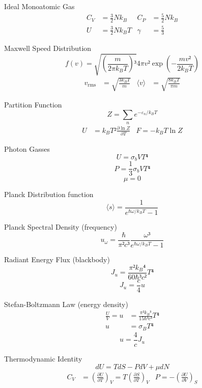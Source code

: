 \documentclass[avery5371]{flashcards}
\begin{document}
\begin{flashcard}{Ideal Monoatomic Gas}
	\begin{align*}
		C_V &= \frac 32 Nk_B
			& C_P &= \frac 52 Nk_B \\
		U &= \frac 32 Nk_B T
			& γ &= \frac 53
	\end{align*}
\end{flashcard}

\begin{flashcard}{Maxwell Speed Distribution}
	\[ f(v) = \sqrt{ (\frac{m}{2π k_B T})³ } 4πv² \exp(-\frac{mv²}{2k_B T}) \]
	\begin{align*}
		v_\mathrm{rms} &= \sqrt{\frac{3k_B T}{m}}
			& ⟨v⟩ &= \sqrt{\frac{8k_B T}{πm}}
	\end{align*}
\end{flashcard}

\begin{flashcard}{Partition Function}
	\[ Z = \sum_n e^{-ε_n / k_B T} \]
	\begin{align*}
		U &= k_B T² \frac{∂ \ln Z}{∂T}
			& F = -k_B T \ln Z
	\end{align*}
\end{flashcard}

\begin{flashcard}{Photon Gasses}
	\[ U = σ_b VT⁴ \]
	\[ P = \frac 13 σ_b VT⁴ \]
	\[ μ = 0 \]
\end{flashcard}

\begin{flashcard}{Planck Distribution function}
	\[ ⟨s⟩ = \frac{1}{e^{ℏω/k_B T} - 1} \]
\end{flashcard}

\begin{flashcard}{Planck Spectral Density (frequency)}
	\[ u_ω = \frac{ℏ}{π²c³} \frac{ω³}{e^{ℏω/k_B T} - 1} \]
\end{flashcard}

\begin{flashcard}{Radiant Energy Flux (blackbody)}
	\[ J_u = \frac{π²{k_B}⁴}{60ℏ³c²} T⁴ \]
	\[ J_u = \frac{c}{4} u \]
\end{flashcard}

\begin{flashcard}{Stefan-Boltzmann Law (energy density)}
	\begin{align*}
		\frac{U}{V} = u &= \frac{π²{k_B}³}{15ℏ³c³} T⁴ \\
			u &= σ_B T⁴
	\end{align*}
	\[ u = \frac{4}{c} J_u \]
\end{flashcard}

\begin{flashcard}{Thermodynamic Identity}
	\[ dU = T dS - P dV + μ dN \]
	\begin{align*}
		C_V &= (\frac{∂U}{∂T})_V = T (\frac{∂S}{∂T})_V
			& P = -(\frac{∂U}{∂V})_S
	\end{align*}
\end{flashcard}
\end{document}
